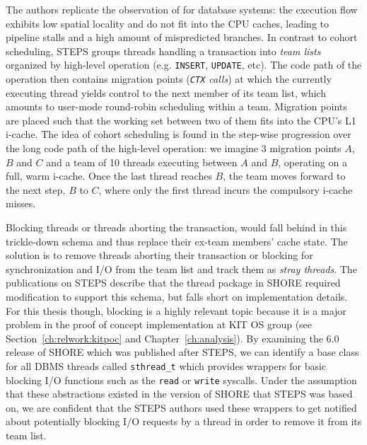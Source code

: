 \documentclass[12pt,a4paper]{book}
\begin{document}
The authors replicate the observation of \cite{cohort} for database systems: the execution flow exhibits low spatial locality and do not fit into the CPU caches, leading to pipeline stalls and a high amount of mispredicted branches.
In contrast to cohort scheduling, STEPS groups threads handling a transaction into \emph{team lists} organized by high-level operation (e.g. \texttt{INSERT}, \texttt{UPDATE}, etc).
The code path of the operation then contains migration points (\textit{\texttt{CTX} calls}) at which the currently executing thread yields control to the next member of its team list, which amounts to user-mode round-robin scheduling within a team.
Migration points are placed such that the working set between two of them fits into the CPU's L1 i-cache.
The idea of cohort scheduling is found in the step-wise progression over the long code path of the high-level operation:
we imagine 3  migration points $A$, $B$ and $C$ and a team of 10 threads executing between $A$ and $B$, operating on a full, warm i-cache.
Once the last thread reaches $B$, the team moves forward to the next step, $B$ to $C$, where only the first thread incurs the compulsory i-cache misses.

Blocking threads or threads aborting the transaction, would fall behind in this trickle-down schema and thus replace their ex-team members' cache state.
The solution is to remove threads aborting their transaction or blocking for synchronization and I/O from the team list and track them as \emph{stray threads}.
The publications on STEPS describe that the thread package in SHORE required modification to support this schema, but falls short on implementation details.
For this thesis though, blocking is a highly relevant topic because it is a major problem in the proof of concept implementation at KIT OS group (see Section~\ref{ch:relwork:kitpoc} and Chapter~\ref{ch:analysis}).
By examining the 6.0 release of SHORE which was published after STEPS, we can identify a base class for all DBMS threads called \texttt{sthread\_t} which provides wrappers for basic blocking I/O functions such as the \texttt{read} or \texttt{write} syscalls.
Under the assumption that these abstractions existed in the version of SHORE that STEPS was based on, we are confident that the STEPS authors used these wrappers to get notified about potentially blocking I/O requests by a thread in order to remove it from its team list.~\cite{shoreRelease}
\end{document}
